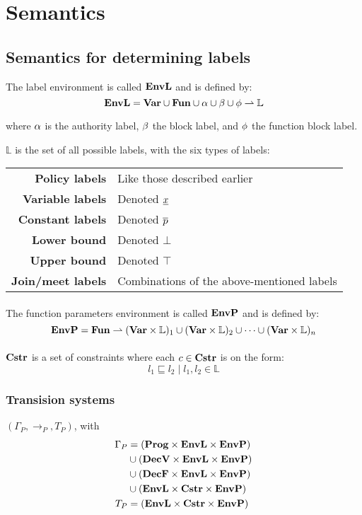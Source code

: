 \section{Semantics}

\subsection{Semantics for determining labels}
The label environment is called $\mathbf{EnvL}$ and is defined by:
\[
  \mathbf{EnvL} = \mathbf{Var} \cup \mathbf{Fun} \cup \alpha \cup \beta \cup \phi \rightharpoonup \mathbb{L}
\]

\noindent where $\alpha$ is the authority label, $\beta$ the block label, and $\phi$ the function block label.

\noindent $\mathbb{L}$ is the set of all possible labels, with the six types of labels: \\

\begin{tabular}{rl}
  \textbf{Policy labels}    & Like those described earlier \\
  \textbf{Variable labels}  & Denoted $\underline{x}$ \\
  \textbf{Constant labels}  & Denoted $\overline{p}$ \\
  \textbf{Lower bound}      & Denoted $\bot$ \\
  \textbf{Upper bound}      & Denoted $\top$ \\
  \textbf{Join/meet labels} & Combinations of the above-mentioned labels
\end{tabular}

\paragraph{}\noindent
The function parameters environment is called $\mathbf{EnvP}$ and is defined by:
\[
  \mathbf{EnvP} = \mathbf{Fun} \rightharpoonup (\mathbf{Var} \times \mathbb{L})_1 \cup (\mathbf{Var} \times \mathbb{L})_2 \cup \dots \cup (\mathbf{Var} \times \mathbb{L})_n
\]

\paragraph{}\noindent
$\mathbf{Cstr}$ is a set of constraints where each $c \in \mathbf{Cstr}$ is on the form:
\[ l_1 \sqsubseteq l_2 \; | \; l_1, l_2 \in \mathbb{L} \]


\subsubsection{Transision systems}
$(\Gamma_P, \rightarrow_P, T_P)$, with
\begin{align*}
  \Gamma_P  & = (\mathbf{Prog} \times \mathbf{EnvL} \times \mathbf{EnvP}) \\
            & \cup (\mathbf{DecV} \times \mathbf{EnvL} \times \mathbf{EnvP}) \\
            & \cup (\mathbf{DecF} \times \mathbf{EnvL} \times \mathbf{EnvP}) \\
            & \cup (\mathbf{EnvL} \times \mathbf{Cstr} \times \mathbf{EnvP}) \\
  T_P       & = (\mathbf{EnvL} \times \mathbf{Cstr} \times \mathbf{EnvP})
\end{align*}

